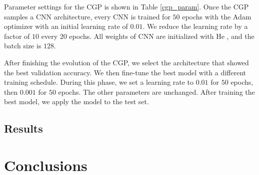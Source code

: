Parameter settings for the CGP is shown in Table \ref{cgp_param}.
Once the CGP samples a CNN architecture, every CNN is trained for $50$ epochs with the Adam optimizer \cite{kingma_adam:_2015} with an initial learning rate of $0.01$.
We reduce the learning rate by a factor of $10$ every $20$ epochs.
All weights of CNN are initialized with He \cite{he_delving_2015}, and the batch size is $128$.

After finishing the evolution of the CGP, we select the architecture that showed the best validation accuracy.
We then fine-tune the best model with a different training schedule.
During this phase, we set a learning rate to $0.01$ for $50$ epochs, then $0.001$ for $50$ epochs.
The other parameters are unchanged.
After training the best model, we apply the model to the test set.

\subsection{Results}


\section{Conclusions}